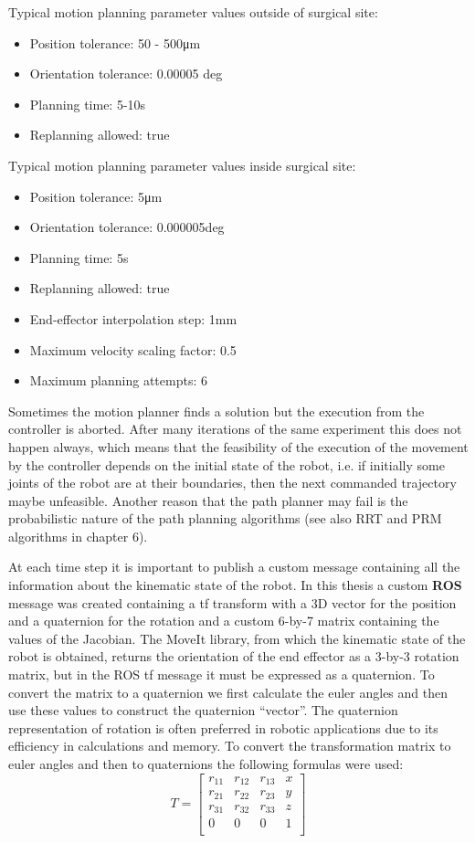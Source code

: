 Typical motion planning parameter values outside of surgical site:
\begin{itemize}
	\item Position tolerance: 50 - 500μm
	\item Orientation tolerance: 0.00005 deg
	\item Planning time: 5-10s
	\item Replanning allowed: true
\end{itemize}

Typical motion planning parameter values inside surgical site:
\begin{itemize}
	\item Position tolerance: 5μm
	\item Orientation tolerance: 0.000005deg
	\item Planning time: 5s
	\item Replanning allowed: true
	\item End-effector interpolation step: 1mm
	\item Maximum velocity scaling factor: 0.5
	\item Maximum planning attempts: 6
\end{itemize}

Sometimes the motion planner finds a solution but the execution from the controller is aborted. 
After many iterations of the same experiment this does not happen always, which means that the 
feasibility of the execution of the movement by the controller depends on the initial state of 
the robot, i.e. if initially some joints of the robot are at their boundaries, then the next 
commanded trajectory maybe unfeasible. Another reason that the path planner may fail is the 
probabilistic nature of the path planning algorithms (see also RRT and PRM algorithms in chapter 6).

At each time step it is important to publish a custom message containing all the information 
about the kinematic state of the robot. In this thesis a custom \textbf{ROS} message was created 
containing a tf transform with a 3D vector for the position and a quaternion for the rotation and 
a custom  6-by-7 matrix containing the values of the Jacobian. The MoveIt library, from which the 
kinematic state of the robot is obtained, returns the orientation of the end effector as a 3-by-3 
rotation matrix, but in the ROS tf message it must be expressed as a quaternion. To convert the 
matrix to a quaternion we first calculate the euler angles and then use these values to construct 
the quaternion “vector”. The quaternion representation of rotation is often preferred in robotic 
applications due to its efficiency in calculations and memory. To convert the transformation 
matrix to euler angles and then to quaternions the following formulas were used:
\[
T = 
\begin{bmatrix}
r_{11} & r_{12} & r_{13} & x \\
r_{21} & r_{22} & r_{23} & y \\
r_{31} & r_{32} & r_{33} & z \\
0 & 0 & 0 & 1\\
\end{bmatrix}
\]

